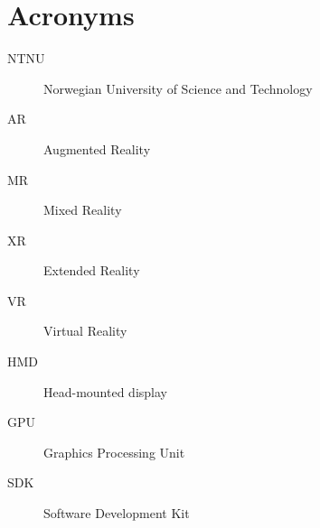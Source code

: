
\chapter{Acronyms}
\begin{description}
\item[NTNU] Norwegian University of Science and Technology
\item[AR] Augmented Reality
\item[MR] Mixed Reality
\item[XR] Extended Reality
\item[VR] Virtual Reality
\item[HMD] Head-mounted display
\item[GPU] Graphics Processing Unit
\item[SDK] Software Development Kit
\end{description}